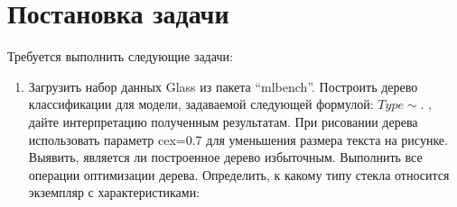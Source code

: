 \documentclass[]{article}
\numberwithin{equation}{section}
\begin{document}
    \section*{Постановка задачи}
    \vspace{-0.1cm}
    Требуется выполнить следующие задачи:
    \begin{enumerate}
        \item Загрузить набор данных Glass из пакета “mlbench”. Построить дерево классификации для модели, задаваемой следующей формулой: $Type \sim.$  , дайте интерпретацию полученным результатам. При рисовании дерева использовать параметр cex=0.7 для уменьшения размера текста на рисунке. Выявить, является ли построенное дерево избыточным. Выполнить все операции оптимизации дерева.
        Определить, к какому типу стекла относится экземпляр с характеристиками:


\end{enumerate}
\end{document}
